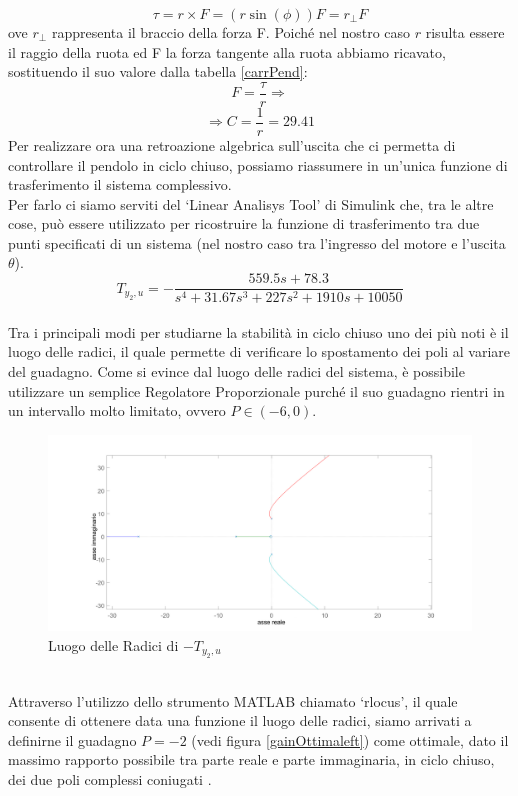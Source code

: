$$\tau=r\times F=(r\sin(\phi))F=r_{\bot}F$$
ove $r_{\bot}$ rappresenta il braccio della forza F.
Poiché nel nostro caso $r$ risulta essere il raggio della ruota ed F la forza tangente alla ruota abbiamo ricavato, sostituendo il suo valore dalla tabella \ref{carrPend}: $$F=\displaystyle\frac{\tau}{r}\Rightarrow$$$$\Rightarrow C=\displaystyle\frac{1}{r}=29.41$$
Per realizzare ora una retroazione algebrica sull'uscita che ci permetta di controllare il pendolo in ciclo chiuso, possiamo riassumere in un'unica funzione di trasferimento il sistema complessivo.\\
Per farlo ci siamo serviti del `Linear Analisys Tool' di Simulink che, tra le altre cose, può essere utilizzato per ricostruire la funzione di trasferimento tra due punti specificati di un sistema (nel nostro caso tra l'ingresso del motore e l'uscita $\theta$).
$$T_{y_2,u}=-\displaystyle\frac{559.5s+78.3}{s^4+31.67s^3+227s^2+1910s+10050}$$\\
Tra i principali modi per studiarne la stabilità in ciclo chiuso uno dei più noti è il luogo delle radici, il quale permette di verificare lo spostamento dei poli al variare del guadagno.
\newpage
Come si evince dal luogo delle radici del sistema, è possibile utilizzare un semplice Regolatore Proporzionale purché il suo guadagno rientri in un intervallo molto limitato, ovvero $P\in(-6,0)$.
\begin{figure}[ht]
	\centering
	\includegraphics[width=\textwidth]{RLocusPendoloNormale.PNG}
	\caption{Luogo delle Radici di $-T_{y_2,u}$}
	\label{RLocusPendoloNormale}
\end{figure}
\\Attraverso l'utilizzo dello strumento MATLAB chiamato `rlocus', il quale consente di ottenere data una funzione il luogo delle radici, siamo arrivati a definirne il guadagno $P=-2$ (vedi figura \ref{gainOttimaleft}) come ottimale, dato il massimo rapporto possibile tra parte reale e parte immaginaria, in ciclo chiuso, dei due poli complessi coniugati .
